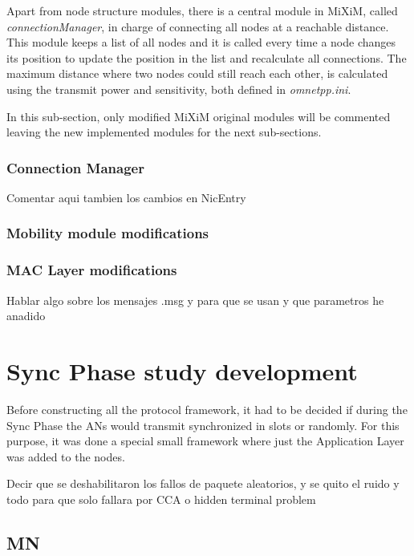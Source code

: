 Apart from node structure modules, there is a central module in \ac{MiXiM}, called \textit{connectionManager}, in charge of connecting
all nodes at a reachable distance. This module keeps a list of all nodes and it is called every time a node changes its position to
update the position in the list and recalculate all connections. The maximum distance where two nodes could still reach each other, is 
calculated using the transmit power and sensitivity, both defined in \textit{omnetpp.ini}.

In this sub-section, only modified \ac{MiXiM} original modules will be commented leaving the new implemented modules for the next sub-sections.

\subsubsection{Connection Manager}

Comentar aqui tambien los cambios en NicEntry

\subsubsection{Mobility module modifications}

\subsubsection{\ac{MAC} Layer modifications}

Hablar algo sobre los mensajes .msg y para que se usan y que parametros he anadido

\section{Sync Phase study development}

Before constructing all the protocol framework, it had to be decided if during the Sync Phase the \acp{AN} would transmit synchronized in 
slots or randomly. For this purpose, it was done a special small framework where just the Application Layer was added to the nodes.

Decir que se deshabilitaron los fallos de paquete aleatorios, y se quito el ruido y todo para que solo fallara por CCA o hidden terminal problem

\subsection{\ac{MN}}

